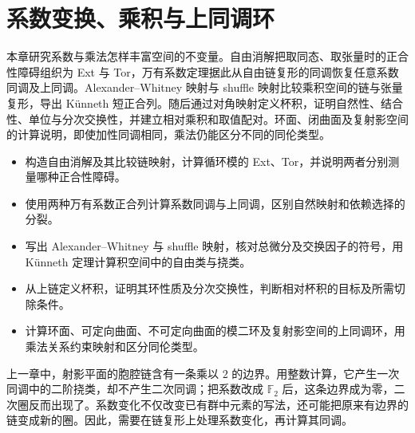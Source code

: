 
% 
% 

\chapter{系数变换、乘积与上同调环}
\label{g2:ch:04}

\begin{chapterabstract}
	本章研究系数与乘法怎样丰富空间的不变量。自由消解把取同态、取张量时的正合性障碍组织为 Ext 与 Tor，万有系数定理据此从自由链复形的同调恢复任意系数同调及上同调。Alexander--Whitney 映射与 shuffle 映射比较乘积空间的链与张量复形，导出 Künneth 短正合列。随后通过对角映射定义杯积，证明自然性、结合性、单位与分次交换性，并建立相对乘积和取值配对。环面、闭曲面及复射影空间的计算说明，即使加性同调相同，乘法仍能区分不同的同伦类型。
\end{chapterabstract}

\begin{learninggoals}
	\begin{itemize}
		\item 构造自由消解及其比较链映射，计算循环模的 Ext、Tor，并说明两者分别测量哪种正合性障碍。
		\item 使用两种万有系数正合列计算系数同调与上同调，区别自然映射和依赖选择的分裂。
		\item 写出 Alexander--Whitney 与 shuffle 映射，核对总微分及交换因子的符号，用 Künneth 定理计算积空间中的自由类与挠类。
		\item 从上链定义杯积，证明其环性质及分次交换性，判断相对杯积的目标及所需切除条件。
		\item 计算环面、可定向曲面、不可定向曲面的模二环及复射影空间的上同调环，用乘法关系约束映射和区分同伦类型。
	\end{itemize}
\end{learninggoals}

上一章中，射影平面的胞腔链含有一条乘以 \(2\) 的边界。用整数计算，它产生一次同调中的二阶挠类，却不产生二次同调；把系数改成 \(\mathbb F_2\) 后，这条边界成为零，二次圈反而出现了。系数变化不仅改变已有群中元素的写法，还可能把原来有边界的链变成新的圈。因此，需要在链复形上处理系数变化，再计算其同调。

\ProseParagraphBreak

